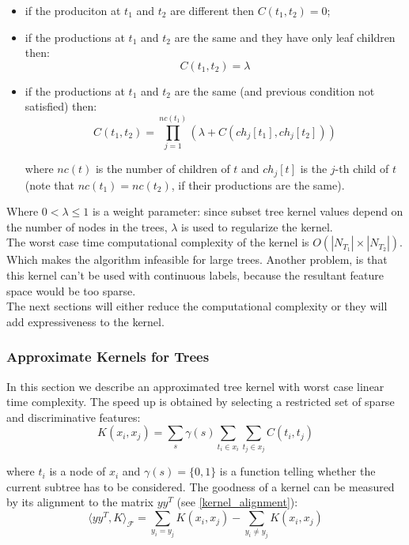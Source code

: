 \begin{itemize}
	\item if the produciton at $t_1$ and $t_2$ are different then $C(t_1, t_2) =
		0$;

	\item if the productions at $t_1$ and $t_2$ are the same and they have only
		leaf children then:
		\begin{equation}
			\label{eq:subset_tree:leaf}
			C(t_1, t_2) = \lambda
		\end{equation}

	\item if the productions at $t_1$ and $t_2$ are the same (and previous
		condition not satisfied) then:
		\begin{equation}
			C(t_1, t_2) = 
			\prod_{j=1}^{nc(t_1)} (\lambda + C(ch_j[t_1], ch_j[t_2]))
		\end{equation}

		where $nc(t)$ is the number of children of $t$ and $ch_j[t]$ is the 
		$j$-th child of $t$ (note that $nc(t_1) = nc(t_2)$, if their productions
		are the same).
\end{itemize}

Where $0 < \lambda \leq 1$ is a weight parameter: since subset tree kernel
values depend on the number of nodes in the trees, $\lambda$ is used to
regularize the kernel.\\
The worst case time computational complexity of the kernel is $O(|N_{T_1}|
\times |N_{T_2}|)$. Which makes the algorithm infeasible for large 
trees. Another problem, is that this kernel can't be used with continuous
labels, because the resultant feature space would be too sparse.\\
The next sections will either reduce the computational complexity or they will
add expressiveness to the kernel.

\subsubsection{Approximate Kernels for Trees}

In this section we describe an approximated tree kernel with worst case linear
time complexity. The speed up is obtained by selecting a restricted set of
sparse and discriminative features:
\begin{equation}
	K(x_i, x_j) = 
		\sum_s \gamma(s) 
		\sum_{t_i \in x_i} \sum_{t_j \in x_j} C(t_i, t_j)
\end{equation}

where $t_i$ is a node of $x_i$ and $\gamma(s) = \{0, 1\}$ is a function telling
whether the current subtree has to be considered.
The goodness of a kernel can be measured by its alignment to the matrix $yy^T$
(see \autoref{kernel_alignment}):
\begin{equation*}
	\langle yy^T, K \rangle_{\mathcal{F}} = 
	\sum_{y_i = y_j} K(x_i, x_j) -
	\sum_{y_i \neq y_j} K(x_i, x_j)
\end{equation*}

